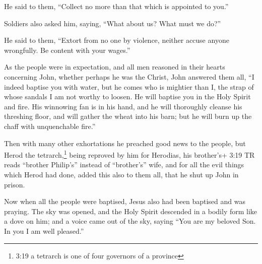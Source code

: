  He said to them, ``Collect no more than that which is
appointed to you.''

 Soldiers also asked him, saying, ``What about us? What
must we do?''

He said to them, ``Extort from no one by violence, neither accuse anyone
wrongfully. Be content with your wages.''

 As the people were in expectation, and all men reasoned in
their hearts concerning John, whether perhaps he was the Christ,
 John answered them all, ``I indeed baptise you with water,
but he comes who is mightier than I, the strap of whose sandals I am not
worthy to loosen. He will baptise you in the Holy Spirit and fire.
 His winnowing fan is in his hand, and he will thoroughly
cleanse his threshing floor, and will gather the wheat into his barn;
but he will burn up the chaff with unquenchable fire.''

 Then with many other exhortations he preached good news to
the people,  but Herod the tetrarch,\footnote{3:19 a
  tetrarch is one of four governors of a province} being reproved by him
for Herodias, his brother's+ 3:19 TR reads ``brother Philip's'' instead
of ``brother's'' wife, and for all the evil things which Herod had done,
 added this also to them all, that he shut up John in
prison.

 Now when all the people were baptised, Jesus also had been
baptised and was praying. The sky was opened,  and the Holy
Spirit descended in a bodily form like a dove on him; and a voice came
out of the sky, saying ``You are my beloved Son. In you I am well
pleased.''

